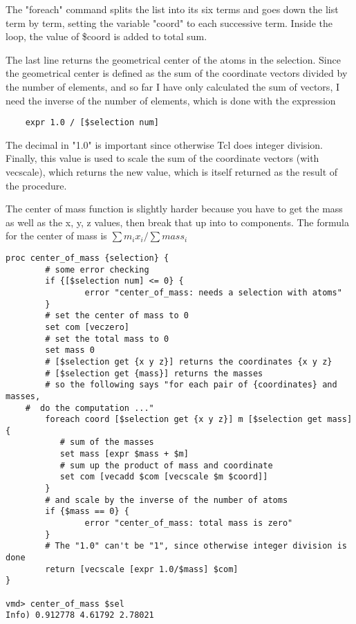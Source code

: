 The "foreach" command splits the list into its six terms and goes down
the list term by term, setting the variable "coord" to each successive
term.  Inside the loop, the value of \$coord is added to total sum.

The last line returns the geometrical center of the atoms in the selection.  
Since the geometrical
center is defined as the sum of the coordinate vectors divided by the
number of elements, and so far I have only calculated the sum of
vectors, I need the inverse of the number of elements, which is
done with the expression
\begin{verbatim}
    expr 1.0 / [$selection num]
\end{verbatim}
The decimal in "1.0" is important since otherwise Tcl does integer
division.  Finally, this value is used to scale the sum of the
coordinate vectors (with vecscale), which returns the new value, which
is itself returned as the result of the procedure.


  The center of mass function is slightly harder because you have to
get the mass as well as the x, y, z values, then break that up into
to components.  
The formula for the center of mass is 
$\sum m_i x_i/\sum mass_i$

\begin{verbatim}
proc center_of_mass {selection} {
        # some error checking
        if {[$selection num] <= 0} {
                error "center_of_mass: needs a selection with atoms"
        }
        # set the center of mass to 0
        set com [veczero]
        # set the total mass to 0
        set mass 0
        # [$selection get {x y z}] returns the coordinates {x y z} 
        # [$selection get {mass}] returns the masses
        # so the following says "for each pair of {coordinates} and masses,
	#  do the computation ..."
        foreach coord [$selection get {x y z}] m [$selection get mass] {
           # sum of the masses
           set mass [expr $mass + $m]
           # sum up the product of mass and coordinate
           set com [vecadd $com [vecscale $m $coord]]
        }
        # and scale by the inverse of the number of atoms
        if {$mass == 0} {
                error "center_of_mass: total mass is zero"
        }
        # The "1.0" can't be "1", since otherwise integer division is done
        return [vecscale [expr 1.0/$mass] $com]
}

vmd> center_of_mass $sel
Info) 0.912778 4.61792 2.78021
\end{verbatim}


